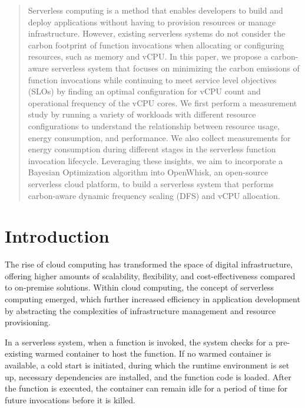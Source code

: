 \documentclass[times, 10pt,twocolumn]{article}
\begin{document}
\begin{abstract}
   Serverless computing is a method that enables developers to build and deploy applications without having to provision resources or manage infrastructure. However, existing serverless systems do not consider the carbon footprint of function invocations when allocating or configuring resources, such as memory and vCPU. In this paper, we propose a carbon-aware serverless system that focuses on minimizing the carbon emissions of function invocations while continuing to meet service level objectives (SLOs) by finding an optimal configuration for vCPU count and operational frequency of the vCPU cores. We first perform a measurement study by running a variety of workloads with different resource configurations to understand the relationship between resource usage, energy consumption, and performance. We also collect measurements for energy consumption during different stages in the serverless function invocation lifecycle. Leveraging these insights, we aim to incorporate a Bayesian Optimization algorithm into OpenWhisk, an open-source serverless cloud platform, to build a serverless system that performs carbon-aware dynamic frequency scaling (DFS) and vCPU allocation. 
\end{abstract}


\section{Introduction}

The rise of cloud computing has transformed the space of digital infrastructure, offering higher amounts of scalability, flexibility, and cost-effectiveness compared to on-premise solutions. Within cloud computing, the concept of serverless computing emerged, which further increased efficiency in application development by abstracting the complexities of infrastructure management and resource provisioning. 

In a serverless system, when a function is invoked, the system checks for a pre-existing warmed container to host the function. If no warmed container is available, a cold start is initiated, during which the runtime environment is set up, necessary dependencies are installed, and the function code is loaded. After the function is executed, the container can remain idle for a period of time for future invocations before it is killed.
\end{document}
